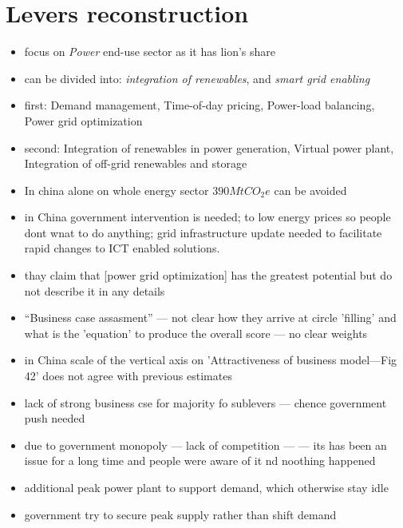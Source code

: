 \documentclass[11pt, twocolumn]{article}
\begin{document}
\section{Levers reconstruction}
\begin{itemize}
\item focus on \emph{Power} end-use sector as it has lion's share

\item can be divided into: \emph{integration of renewables}, and \emph{smart grid enabling}
\item first: Demand management, Time-of-day pricing, Power-load balancing, Power grid optimization
\item second: Integration of renewables in power generation, Virtual power plant, Integration of off-grid renewables and storage

\item In china alone on whole energy sector $390Mt CO_2e$ can be avoided

\item in China government intervention is needed; to low energy prices so people dont wnat to do anything; grid infrastructure update needed to facilitate rapid changes to ICT enabled solutions.
\item thay claim that [power grid optimization] has the greatest potential but do not describe it in any details
\item ``Business case assasment'' --- not clear how they arrive at circle 'filling' and what is the 'equation' to produce the overall score --- no clear weights

\item in China scale of the vertical axis on 'Attractiveness of business model---Fig 42' does not agree with previous estimates

\item lack of strong business cse for majority fo sublevers --- chence government push needed

\item due to government monopoly --- lack of competition --- --- its has been an issue for a long time and people were aware of it nd noothing happened

\item additional peak power plant to support demand, which otherwise stay idle
\item government try to secure peak supply rather than shift demand



\end{itemize}
\end{document}
